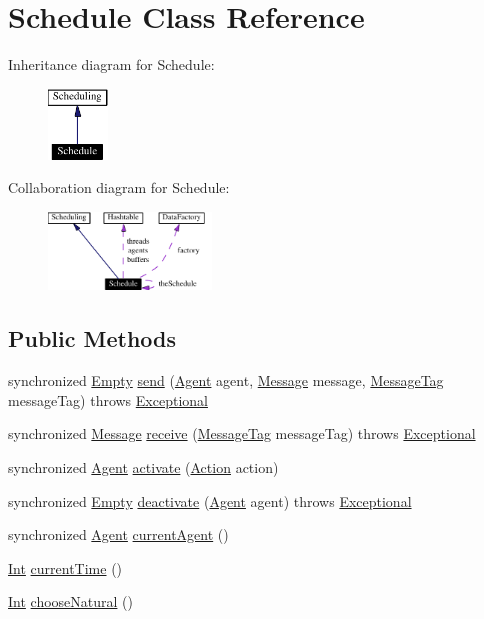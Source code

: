 \hypertarget{classSchedule}{
\section{Schedule  Class Reference}
\label{classSchedule}
}
Inheritance diagram for Schedule:\begin{figure}[H]
\begin{center}
\leavevmode
\includegraphics[width=45pt]{classSchedule__inherit__graph}
\end{center}
\end{figure}
Collaboration diagram for Schedule:\begin{figure}[H]
\begin{center}
\leavevmode
\includegraphics[width=123pt]{classSchedule__coll__graph}
\end{center}
\end{figure}
\subsection*{Public Methods}
\begin{CompactItemize}
\item 
synchronized \hyperlink{interfaceEmpty}{Empty} \hyperlink{classSchedule_a0}{send} (\hyperlink{interfaceAgent}{Agent} agent, \hyperlink{interfaceMessage}{Message} message, \hyperlink{interfaceMessageTag}{Message\-Tag} message\-Tag) throws \hyperlink{classExceptional}{Exceptional}
\item 
synchronized \hyperlink{interfaceMessage}{Message} \hyperlink{classSchedule_a1}{receive} (\hyperlink{interfaceMessageTag}{Message\-Tag} message\-Tag) throws \hyperlink{classExceptional}{Exceptional}
\item 
synchronized \hyperlink{interfaceAgent}{Agent} \hyperlink{classSchedule_a2}{activate} (\hyperlink{interfaceAction}{Action} action)
\item 
synchronized \hyperlink{interfaceEmpty}{Empty} \hyperlink{classSchedule_a3}{deactivate} (\hyperlink{interfaceAgent}{Agent} agent) throws \hyperlink{classExceptional}{Exceptional}
\item 
synchronized \hyperlink{interfaceAgent}{Agent} \hyperlink{classSchedule_a4}{current\-Agent} ()
\item 
\hyperlink{interfaceInt}{Int} \hyperlink{classSchedule_a5}{current\-Time} ()
\item 
\hyperlink{interfaceInt}{Int} \hyperlink{classSchedule_a6}{choose\-Natural} ()
\end{CompactItemize}
